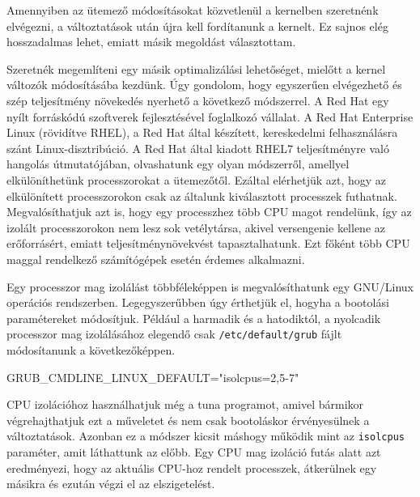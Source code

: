 Amennyiben az ütemező módosításokat közvetlenül a kernelben szeretnénk elvégezni, a változtatások után újra kell fordítanunk a kernelt.
Ez sajnos elég hosszadalmas lehet, emiatt másik megoldást választottam.


Szeretnék megemlíteni egy másik optimalizálási lehetőséget, mielőtt a kernel változók módosításába kezdünk. Úgy gondolom, hogy egyszerűen elvégezhető és szép teljesítmény növekedés nyerhető a következő módszerrel.
A Red Hat egy nyílt forráskódú szoftverek fejlesztésével foglalkozó vállalat. A Red Hat Enterprise Linux (rövidítve RHEL), a Red Hat által készített, kereskedelmi felhasználásra szánt Linux-disztribúció.
A Red Hat által kiadott RHEL7 teljesítményre való hangolás útmutatójában, olvashatunk egy olyan módszerről, amellyel elkülöníthetünk processzorokat a ütemezőtől. Ezáltal elérhetjük azt, hogy az elkülönített processzorokon csak az általunk kiválasztott processzek futhatnak. Megvalósíthatjuk azt is, hogy egy processzhez több CPU magot rendelünk, így az izolált processzorokon nem lesz sok vetélytársa, akivel versengenie kellene az erőforrásért, emiatt teljesítménynövekvést tapasztalhatunk.
Ezt főként több CPU maggal rendelkező számítógépek esetén érdemes alkalmazni.

Egy processzor mag izolálást többféleképpen is megvalósíthatunk egy GNU/Linux operációs rendszerben.
Legegyszerűbben úgy érthetjük el, hogyha a bootolási paramétereket módosítjuk. Például a harmadik és a hatodiktól, a nyolcadik processzor mag izolálásához elegendő csak \texttt{/etc/default/grub} fájlt módosítanunk a következőképpen.

\begin{python}
GRUB_CMDLINE_LINUX_DEFAULT="isolcpus=2,5-7"
\end{python}

CPU izolációhoz használhatjuk még a tuna programot, amivel bármikor végrehajthatjuk ezt a műveletet és nem csak bootoláskor érvényesülnek a változtatások. Azonban ez a módszer kicsit máshogy működik mint az \texttt{isolcpus} paraméter, amit láthattunk az előbb. Egy CPU mag izoláció futás alatt azt eredményezi, hogy az aktuális CPU-hoz rendelt processzek, átkerülnek egy másikra és ezután végzi el az elszigetelést.

